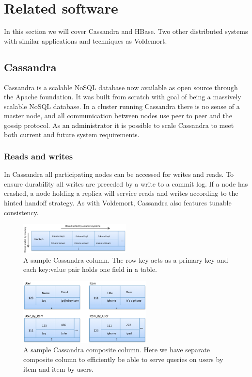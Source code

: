 \section{Related software}
\label{sec:related_software}
In this section we will cover Cassandra and HBase. Two other distributed systems with similar applications and techniques as Voldemort.

\subsection{Cassandra}
Cassandra is a scalable NoSQL database now available as open source through the Apache foundation. It was built from scratch with goal of being a massively scalable NoSQL database. In a cluster running Cassandra there is no sense of a master node, and all communication between nodes use peer to peer and the gossip protocol. As an administrator it is possible to scale Cassandra to meet both current and future system requirements. 

\subsubsection{Reads and writes}
In Cassandra all participating nodes can be accessed for writes and reads. To ensure durability all writes are preceded by a write to a commit log. If a node has crashed, a node holding a replica will service reads and writes according to the hinted handoff strategy. As with Voldemort, Cassandra also features tunable consistency. 

\begin{figure}[h]
    \centering
    \includegraphics[width=0.5\textwidth]{resources/cas_col.png}
    \caption{A sample Cassandra column\protect\footnotemark. The row key acts as a primary key and each key:value pair holds one field in a table.}
    \label{fig:sample_col}
\end{figure}

\begin{figure}[h]
    \centering
    \includegraphics[width=0.6\textwidth]{resources/cas_comp_col.png}
    \caption{A sample Cassandra composite column. Here we have separate composite column to efficiently be able to serve queries on users by item and item by users.}
    \label{fig:sample_comp_col}
\end{figure}

